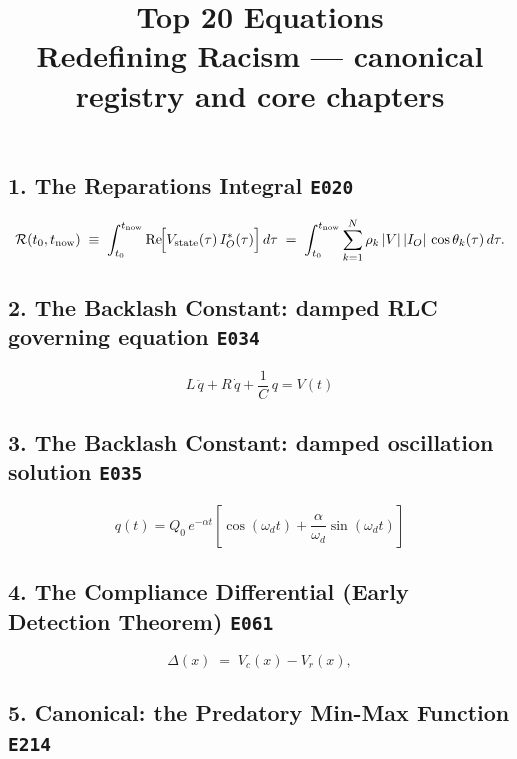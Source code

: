 \documentclass[11pt]{article}
\title{Top 20 Equations\\\large Redefining Racism --- canonical registry and core chapters}
\date{}
\begin{document}
\maketitle

\subsection*{1. The Reparations Integral \hfill \texttt{E020}}

\begin{equation}\label{eq:0.16-reparations-integral}
\mathcal{R}(t_0, t_{\text{now}}) \;\equiv\; \int_{t_0}^{t_{\text{now}}} \operatorname{Re}\!\Bigl[V_{\text{state}}(\tau)\, I_{O}^{*}(\tau)\Bigr]\, d\tau \;=\; \int_{t_0}^{t_{\text{now}}} \sum_{k=1}^{N} \rho_k\, |V|\,|I_O|\,\cos\theta_k(\tau)\, d\tau.
\end{equation}

\subsection*{2. The Backlash Constant: damped RLC governing equation \hfill \texttt{E034}}

\begin{equation}\label{eq:1.7a-rlc-governing}
L\,\ddot{q} + R\,\dot{q} + \frac{1}{C}\,q = V(t)
\end{equation}

\subsection*{3. The Backlash Constant: damped oscillation solution \hfill \texttt{E035}}

\begin{equation}\label{eq:1.7b-rlc-solution}
q(t) = Q_0\,e^{-\alpha t}\!\left[\cos(\omega_d t) + \frac{\alpha}{\omega_d}\sin(\omega_d t)\right]
\end{equation}

\subsection*{4. The Compliance Differential (Early Detection Theorem) \hfill \texttt{E061}}

\begin{equation}\label{eq:5.1-compliance-differential}
\Delta(x) \;=\; V_c(x) - V_r(x),
\end{equation}

\subsection*{5. Canonical: the Predatory Min-Max Function \hfill \texttt{E214}}
\end{document}
